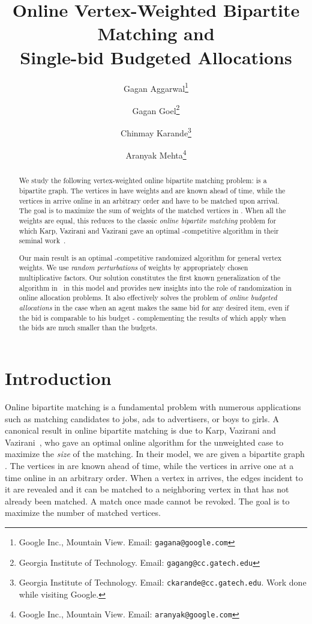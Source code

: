 \documentclass[11pt]{article}
\title{Online Vertex-Weighted Bipartite Matching and\\ Single-bid Budgeted Allocations}
\author{Gagan Aggarwal\thanks{Google Inc., Mountain View. Email: \texttt{gagana@google.com}} \and Gagan Goel\thanks{Georgia Institute of Technology. Email: \texttt{gagang@cc.gatech.edu}} \and Chinmay Karande\thanks{Georgia Institute of Technology. Email: \texttt{ckarande@cc.gatech.edu}. Work done while visiting Google.} \and Aranyak Mehta\thanks{Google Inc., Mountain View. Email:  \texttt{aranyak@google.com}}}
\date{}
\begin{document}
\maketitle
\thispagestyle{empty}
\begin{abstract}
We study the following vertex-weighted online bipartite matching
problem:  is a bipartite graph. The vertices in  have
weights and are known ahead of time, while the vertices in  arrive
online in an arbitrary order and have to be matched upon arrival. The
goal is to maximize the sum of weights of the matched vertices in
. When all the weights are equal, this reduces to the classic
\emph{online bipartite matching} problem for which Karp, Vazirani and
Vazirani gave an optimal -competitive
algorithm in their seminal work~\cite{KVV90}.

Our main result is an optimal -competitive
randomized algorithm for general vertex weights. We use \emph{random
  perturbations} of weights by appropriately chosen multiplicative
factors. Our solution constitutes the first known generalization of
the algorithm in~\cite{KVV90} in this model and
provides new insights into the role of randomization in online
allocation problems. It also effectively solves the problem of
\emph{online budgeted allocations} \cite{MSVV05} in the case when an
agent makes the same bid for any desired item, even if the bid is
comparable to his budget - complementing the results of \cite{MSVV05,
  BJN07} which apply when the bids are much smaller than the budgets.
\end{abstract}

\newpage
\setcounter{page}{1}

\section{Introduction}
\label{section:intro}
Online bipartite matching is a fundamental problem with numerous
applications such as matching candidates to jobs, ads to advertisers,
or boys to girls. A canonical result in online bipartite matching is
due to Karp, Vazirani and Vazirani~\cite{KVV90}, who gave an optimal
online algorithm for the unweighted case to maximize the {\em size} of
the matching. In their model, we are given a
bipartite graph . The vertices in  are known ahead of
time, while the vertices in  arrive one at a time online in an
arbitrary order. When a vertex in  arrives, the edges incident to
it are revealed and it can be matched to a neighboring vertex in 
that has not already been matched. A match once made cannot be
revoked. The goal is to maximize the number of matched vertices. 
\end{document}
